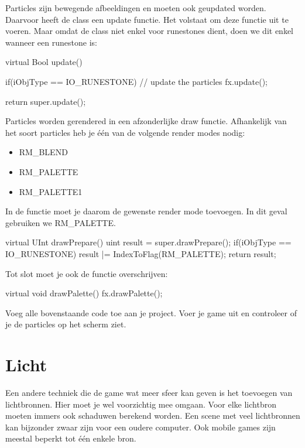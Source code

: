Particles zijn bewegende afbeeldingen en moeten ook geupdated worden. Daarvoor heeft de class  een update functie. Het volstaat om deze functie uit te voeren. Maar omdat de  class niet enkel voor runestones dient, doen we dit enkel wanneer  een runestone is:

\begin{code}
virtual Bool update()
{
  if(iObjType == IO_RUNESTONE)
  {
     // update the particles
     fx.update();
  }
  
  return super.update();
}
\end{code}

Particles worden gerendered in een afzonderlijke draw functie. Afhankelijk van het soort particles heb je \'e\'en van de volgende render modes nodig:

\begin{itemize}
	\item RM\_BLEND
	\item RM\_PALETTE
	\item RM\_PALETTE1
\end{itemize}

In de  functie moet je daarom de gewenste render mode toevoegen. In dit geval gebruiken we RM\_PALETTE.

\begin{code}
virtual UInt drawPrepare()
{     
  uint result = super.drawPrepare();  
  if(iObjType == IO_RUNESTONE)
  {
     result |= IndexToFlag(RM_PALETTE);
  } 
  return result;
}
\end{code}

Tot slot moet je ook de functie  overschrijven:
\begin{code}
virtual void drawPalette()
{
   fx.drawPalette();
}
\end{code}

\begin{exercise} 
Voeg alle bovenstaande code toe aan je project. Voer je game uit en controleer of je de particles op het scherm ziet.
\end{exercise}

\section{Licht}
Een andere techniek die de game wat meer sfeer kan geven is het toevoegen van lichtbronnen. Hier moet je wel voorzichtig mee omgaan. Voor elke lichtbron moeten immers ook schaduwen berekend worden. Een scene met veel lichtbronnen kan bijzonder zwaar zijn voor een oudere computer. Ook mobile games zijn meestal beperkt tot \'e\'en enkele bron.

